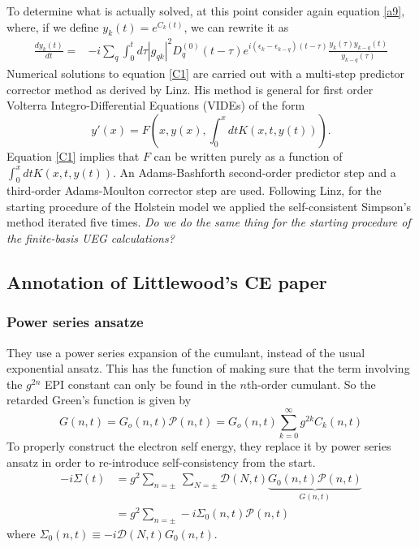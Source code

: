 To determine what is actually solved, at this point consider again equation \eqref{a9}, where, if we define $y_k(t)=e^{C_k(t)}$, we can rewrite it as
\begin{align}
\frac{d y_k(t)}{d t}= & -i \sum_q \int_0^t d \tau\left|g_{q k}\right|^2 D_q^{(0)}(t-\tau) e^{i(\epsilon_k-\epsilon_{k-q})(t-\tau)} \frac{y_k(\tau) y_{k-q}(t)}{y_{k-q}(\tau)} \label{C1}
\end{align}
Numerical solutions to equation \eqref{C1} are carried out with a multi-step predictor corrector method as derived by Linz.  His method is general for first order Volterra Integro-Differential Equations (VIDEs) of the form
\begin{equation}
    y'(x)=F\left(x, y(x), \int_0^x d t K(x, t, y(t))\right).
\end{equation}
Equation \eqref{C1} implies that $F$ can be written purely as a function of $\int_0^x d t K(x, t, y(t))$. An Adams-Bashforth second-order predictor step and a third-order Adams-Moulton corrector step are used. Following Linz, for the starting procedure of the Holstein model we applied the self-consistent Simpson's method iterated five times. \emph{Do we do the same thing for the starting procedure of the finite-basis UEG calculations?}
\subsection{Annotation of Littlewood's CE paper}
\subsubsection{Power series ansatze}
They use a power series expansion of the cumulant, instead of the usual exponential ansatz. This has the function of making sure that the term involving the $g^{2n}$ EPI constant can only be found in the $n$th-order cumulant. So the retarded Green's function is given by
\begin{equation}
    G(n,t) = G_o(n,t) \mathcal{P}(n,t) = G_o(n,t)\sum_{k=0}^\infty g^{2k} C_k(n,t)
\end{equation}
To properly construct the electron self energy, they replace it by power series ansatz in order to re-introduce self-consistency from the start.
\begin{equation}
    \begin{aligned}
        -i\Sigma(t) &= g^2 \sum_{n=\pm}\,\sum_{N= \pm} \mathcal{D}(N,t)\underbrace{G_0(n, t)\mathcal{P}(n,t)}_{G(n,t)}\\
    &=g^2 \sum_{n=\pm}-i\Sigma_0(n,t)\mathcal{P}(n,t)
\end{aligned}
\label{Power corrected self energy}
\end{equation}
where $\Sigma _0(n,t) \equiv -i\mathcal{D}(N,t)G_0(n, t)$.
